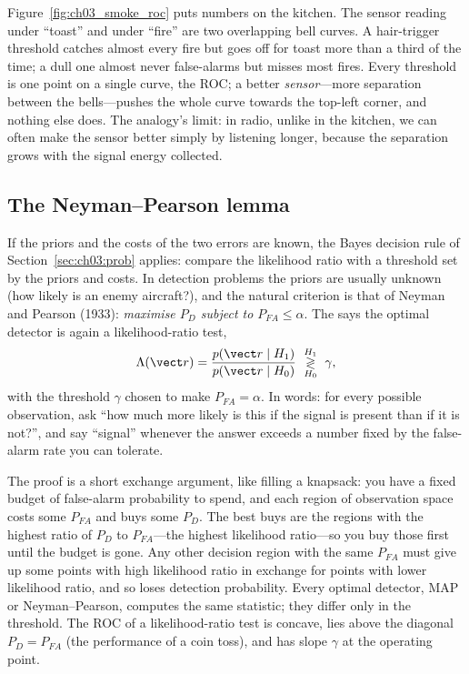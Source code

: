 \begin{analogy}
Figure~\ref{fig:ch03_smoke_roc} puts numbers on the kitchen. The sensor reading under ``toast'' and under
``fire'' are two overlapping bell curves. A hair-trigger threshold catches almost every fire but goes off
for toast more than a third of the time; a dull one almost never false-alarms but misses most fires. Every
threshold is one point on a single curve, the ROC; a better \emph{sensor}---more separation between the
bells---pushes the whole curve towards the top-left corner, and nothing else does. The analogy's limit: in
radio, unlike in the kitchen, we can often make the sensor better simply by listening longer, because the
separation grows with the signal energy collected.
\end{analogy}


\subsection{The Neyman--Pearson lemma}

If the priors and the costs of the two errors are known, the Bayes decision rule of
Section~\ref{sec:ch03:prob} applies: compare the likelihood ratio with a threshold set by the priors and
costs. In detection problems the priors are usually unknown (how likely is an enemy aircraft?), and the
natural criterion is that of Neyman and Pearson (1933): \emph{maximise $P_D$ subject to $P_{FA}\le\alpha$}.
The  says the optimal detector is again a likelihood-ratio test,
\begin{equation}
\Lambda(\vect r)=\frac{p(\vect r\mid H_1)}{p(\vect r\mid H_0)}\ \underset{H_0}{\overset{H_1}{\gtrless}}\ \gamma,
\label{eq:ch03:lrt}
\end{equation}
with the threshold $\gamma$ chosen to make $P_{FA}=\alpha$. In words: for every possible observation, ask
``how much more likely is this if the signal is present than if it is not?'', and say ``signal'' whenever the
answer exceeds a number fixed by the false-alarm rate you can tolerate.

The proof is a short exchange argument, like filling a knapsack: you have a fixed budget of false-alarm
probability to spend, and each region of observation space costs some $P_{FA}$ and buys some $P_D$. The
best buys are the regions with the highest ratio of $P_D$ to $P_{FA}$---the highest likelihood ratio---so you
buy those first until the budget is gone. Any other decision region with the same $P_{FA}$ must give up
some points with high likelihood ratio in exchange for points with lower likelihood ratio, and so loses
detection probability. Every optimal detector, MAP or Neyman--Pearson, computes the same statistic; they
differ only in the threshold. The ROC of a likelihood-ratio test is concave, lies above the diagonal
$P_D=P_{FA}$ (the performance of a coin toss), and has slope $\gamma$ at the operating point.

